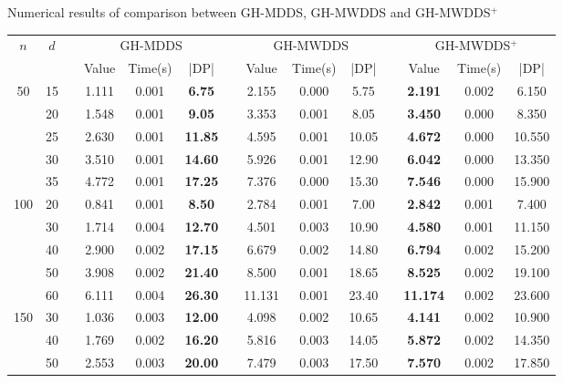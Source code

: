 \documentclass[algorithms,article,accept,moreauthors,pdftex]{Definitions/mdpi}
\begin{document}
\begin{specialtable}
\widetable
\caption{Numerical results of comparison between GH-MDDS, GH-MWDDS and GH-MWDDS$^{+}$ \label{tab2:results}}
\begin{footnotesize}
\begin{tabular}{cccccccccccccc} 
\toprule
$n$ & $d$ && \multicolumn{3}{c}{GH-MDDS} && \multicolumn{3}{c}{GH-MWDDS} && \multicolumn{3}{c}{GH-MWDDS$^{+}$}\\ 
\noalign{\smallskip}  \cline{4-6}  \cline{8-10} \cline{12-14}  \noalign{\smallskip}
  &   & & Value  &  Time(s)  & |DP| & & Value  &  Time(s)  & |DP| & & Value  &  Time(s)  & |DP|  \\ 
\midrule
50 & 15 & &  1.111 & 0.001 & {\bf 6.75}   & &  2.155 & 0.000 & 5.75   & & {\bf 2.191} &   0.002 & 6.150\\
  & 20 & &   1.548 & 0.001 & {\bf 9.05}   & &  3.353 & 0.001 & 8.05   & & {\bf 3.450} &   0.000 & 8.350\\
  & 25 & &   2.630 & 0.001 & {\bf 11.85}  & &  4.595 & 0.001 & 10.05  & & {\bf 4.672} &   0.000 & 10.550\\
  & 30 & &   3.510 & 0.001 & {\bf 14.60}  & &  5.926 & 0.001 & 12.90  & & {\bf 6.042} &   0.000 & 13.350\\
  & 35 & &   4.772 & 0.001 & {\bf 17.25}  & &  7.376 & 0.000 & 15.30  & & {\bf 7.546} &   0.000 & 15.900\\
 \midrule
100 & 20 & & 0.841 & 0.001 & {\bf 8.50}   & &  2.784  & 0.001 & 7.00 & & {\bf 2.842}  &   0.001 & 7.400\\
  & 30 & &   1.714 & 0.004 & {\bf 12.70}  & &  4.501 & 0.003 & 10.90  & &  {\bf 4.580} &   0.001 & 11.150\\
  & 40 & &   2.900 & 0.002 & {\bf 17.15}  & &  6.679 & 0.002 & 14.80  & &  {\bf 6.794} &   0.002 & 15.200\\
  & 50 & &   3.908 & 0.002 & {\bf 21.40}  & &  8.500 & 0.001 & 18.65  & &  {\bf 8.525} &   0.002 & 19.100\\
  & 60 & &   6.111 & 0.004 & {\bf 26.30} & & 11.131  & 0.001 & 23.40  & &  {\bf 11.174} &  0.002 & 23.600\\
    \midrule
150 & 30 & & 1.036 & 0.003 & {\bf 12.00}  & &  4.098 & 0.002 & 10.65  & &  {\bf 4.141} & 0.002 & 10.900\\
  & 40 & &   1.769 & 0.002 & {\bf 16.20}  & &  5.816 & 0.003 & 14.05  & &  {\bf 5.872} & 0.002 & 14.350\\
  & 50 & &   2.553 & 0.003 & {\bf 20.00}  & &  7.479 & 0.003 & 17.50  & &  {\bf 7.570} & 0.002 & 17.850\\

\end{tabular}
\end{footnotesize}
\end{specialtable}
\end{document}
